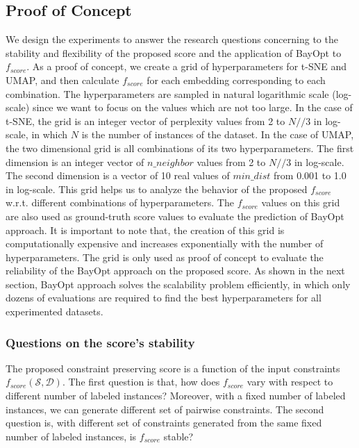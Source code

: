 \subsection{Proof of Concept}
We design the experiments to answer the research questions concerning to the stability and flexibility of the proposed score and the application of BayOpt to $f_{score}$.
As a proof of concept, we create a grid of hyperparameters for t-SNE and UMAP, and then calculate $f_{score}$ for each embedding corresponding to each combination.
The hyperparameters are sampled in natural logarithmic scale (log-scale) since we want to focus on the values which are not too large.
In the case of t-SNE, the grid is an integer vector of perplexity values from 2 to $N // 3$ in log-scale, in which $N$ is the number of instances of the dataset.
In the case of UMAP, the two dimensional grid is all combinations of its two hyperparameters.
The first dimension is an integer vector of $n\_neighbor$ values from 2 to $N // 3$ in log-scale.
The second dimension is a vector of 10 real values of $min\_dist$ from 0.001 to 1.0 in log-scale.
This grid helps us to analyze the behavior of the proposed $f_{score}$ w.r.t. different combinations of hyperparameters.
The $f_{score}$ values on this grid are also used as ground-truth score values to evaluate the prediction of BayOpt approach.
It is important to note that, the creation of this grid is computationally expensive and increases exponentially with the number of hyperparameters.
The grid is only used as proof of concept to evaluate the reliability of the BayOpt approach on the proposed score.
As shown in the next section, BayOpt approach solves the scalability problem efficiently, in which only dozens of evaluations are required to find the best hyperparameters for all experimented datasets.


\subsubsection*{Questions on the score's stability}
The proposed constraint preserving score is a function of the input constraints $f_{score}(\mathcal{S}, \mathcal{D})$.
The first question is that, how does $f_{score}$ vary with respect to different number of labeled instances?
Moreover, with a fixed number of labeled instances, we can generate different set of pairwise constraints.
The second question is, with different set of constraints generated from the same fixed number of labeled instances, is $f_{score}$ stable?

